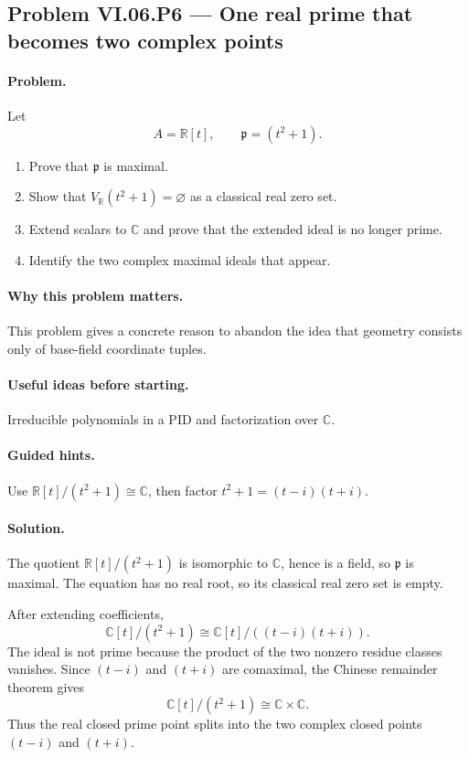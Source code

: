 \subsection*{Problem VI.06.P6 --- One real prime that becomes two complex points}
\label{prob:vi-06-p6}

\paragraph{Problem.}
Let
\[
A=\mathbb R[t],\qquad \mathfrak p=(t^2+1).
\]
\begin{enumerate}
\item Prove that \(\mathfrak p\) is maximal.
\item Show that \(V_{\mathbb R}(t^2+1)=\varnothing\) as a classical real zero set.
\item Extend scalars to \(\mathbb C\) and prove that the extended ideal is no longer prime.
\item Identify the two complex maximal ideals that appear.
\end{enumerate}

\ifdefined\FullProblemDossiers
\paragraph{Why this problem matters.}
This problem gives a concrete reason to abandon the idea that geometry consists only of
base-field coordinate tuples.

\paragraph{Useful ideas before starting.}
Irreducible polynomials in a PID and factorization over \(\mathbb C\).

\paragraph{Guided hints.}
Use \(\mathbb R[t]/(t^2+1)\cong\mathbb C\), then factor
\(t^2+1=(t-i)(t+i)\).

\paragraph{Solution.}
The quotient \(\mathbb R[t]/(t^2+1)\) is isomorphic to \(\mathbb C\), hence is a field,
so \(\mathfrak p\) is maximal.  The equation has no real root, so its classical real zero
set is empty.

After extending coefficients,
\[
\mathbb C[t]/(t^2+1)
\cong
\mathbb C[t]/((t-i)(t+i)).
\]
The ideal is not prime because the product of the two nonzero residue classes vanishes.
Since \((t-i)\) and \((t+i)\) are comaximal, the Chinese remainder theorem gives
\[
\mathbb C[t]/(t^2+1)\cong\mathbb C\times\mathbb C.
\]
Thus the real closed prime point splits into the two complex closed points
\((t-i)\) and \((t+i)\).

